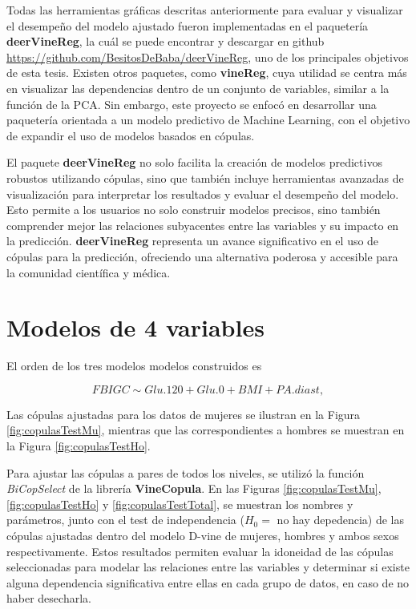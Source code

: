 Todas las herramientas gráficas descritas anteriormente para evaluar y visualizar el desempeño del modelo ajustado fueron implementadas en el paquetería \textbf{deerVineReg}, la cuál se puede encontrar y descargar en github \url{https://github.com/BesitosDeBaba/deerVineReg}, uno de los principales objetivos de esta tesis. Existen otros paquetes, como \textbf{vineReg}, cuya utilidad se centra más en visualizar las dependencias dentro de un conjunto de variables, similar a la función de la PCA. Sin embargo, este proyecto se enfocó en desarrollar una paquetería orientada a un modelo predictivo de Machine Learning, con el objetivo de expandir el uso de modelos basados en cópulas.

El paquete \textbf{deerVineReg} no solo facilita la creación de modelos predictivos robustos utilizando cópulas, sino que también incluye herramientas avanzadas de visualización para interpretar los resultados y evaluar el desempeño del modelo. Esto permite a los usuarios no solo construir modelos precisos, sino también comprender mejor las relaciones subyacentes entre las variables y su impacto en la predicción. \textbf{deerVineReg} representa un avance significativo en el uso de cópulas para la predicción, ofreciendo una alternativa poderosa y accesible para la comunidad científica y médica.

\section{Modelos de 4 variables}

El orden de los tres modelos modelos construidos es  

\begin{equation}\label{ordenVar4}
     FBIGC \sim Glu.120 + Glu.0 + BMI + PA.diast,
\end{equation}

Las cópulas ajustadas para los datos de mujeres se ilustran en la Figura \ref{fig:copulasTestMu}, mientras que las correspondientes a hombres se muestran en la Figura \ref{fig:copulasTestHo}.


Para ajustar las cópulas a pares de todos los niveles, se utilizó la función \textit{BiCopSelect} de la librería \textbf{VineCopula}. En las Figuras  \ref{fig:copulasTestMu}, \ref{fig:copulasTestHo} y \ref{fig:copulasTestTotal}, se muestran los nombres y parámetros, junto con el test de independencia ($H_0 =$ no hay depedencia) de las cópulas ajustadas dentro del modelo D-vine de mujeres, hombres y ambos sexos respectivamente. Estos resultados permiten evaluar la idoneidad de las cópulas seleccionadas para modelar las relaciones entre las variables y determinar si existe alguna dependencia significativa entre ellas en cada grupo de datos, en caso de no haber desecharla. 


